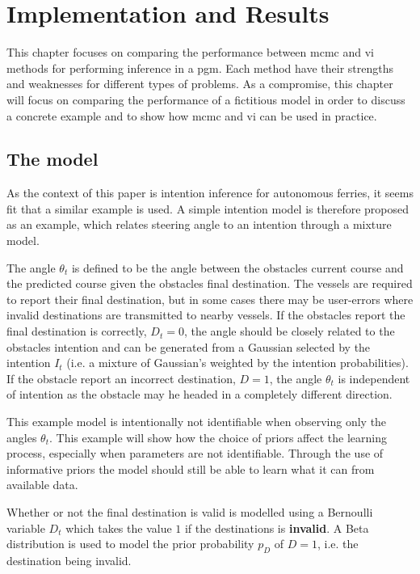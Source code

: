 \chapter{Implementation and Results}\label{chap:impl}

This chapter focuses on comparing the performance between \acrshort{mcmc} and \acrshort{vi} methods for performing inference in a \acrshort{pgm}. Each method have their strengths and weaknesses for different types of problems. As a compromise, this chapter will focus on comparing the performance of a fictitious model in order to discuss a concrete example and to show how \acrshort{mcmc} and \acrshort{vi} can be used in practice.  

\section{The model}
As the context of this paper is intention inference for autonomous ferries, it seems fit that a similar example is used. A simple intention model is therefore proposed as an example, which relates steering angle to an intention through a mixture model. 

The angle $\theta_t$ is defined to be the angle between the obstacles current course and the predicted course given the obstacles final destination. The vessels are required to report their final destination, but in some cases there may be user-errors where invalid destinations are transmitted to nearby vessels. If the obstacles report the final destination is correctly, $D_t=0$, the angle should be closely related to the obstacles intention and can be generated from a Gaussian selected by the intention $I_t$ (i.e. a mixture of Gaussian's weighted by the intention probabilities). If the obstacle report an incorrect destination, $D=1$, the angle $\theta_t$ is independent of intention as the obstacle may he headed in a completely different direction.

This example model is intentionally not identifiable when observing only the angles $\theta_t$. This example will show how the choice of priors affect the learning process, especially when parameters are not identifiable. Through the use of informative priors the model should still be able to learn what it can from available data.   

Whether or not the final destination is valid is modelled using a Bernoulli variable $D_t$ which takes the value $1$ if the destinations is \textbf{invalid}. A Beta distribution is used to model the prior probability $p_D$ of $D=1$, i.e. the destination being invalid.  

